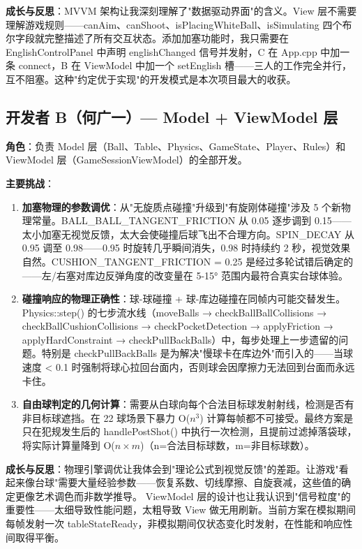 \documentclass[11pt]{ctexart}
\begin{document}
\textbf{成长与反思}：MVVM 架构让我深刻理解了"数据驱动界面"的含义。View 层不需要理解游戏规则——canAim、canShoot、isPlacingWhiteBall、isSimulating 四个布尔字段就完整描述了所有交互状态。添加加塞功能时，我只需要在 EnglishControlPanel 中声明 englishChanged 信号并发射，C 在 App.cpp 中加一条 connect，B 在 ViewModel 中加一个 setEnglish 槽——三人的工作完全并行，互不阻塞。这种"约定优于实现"的开发模式是本次项目最大的收获。

\subsection{开发者 B（何广一）— Model + ViewModel 层}

\textbf{角色}：负责 Model 层（Ball、Table、Physics、GameState、Player、Rules）和 ViewModel 层（GameSessionViewModel）的全部开发。

\textbf{主要挑战}：
\begin{enumerate}[leftmargin=*]
\item \textbf{加塞物理的参数调优}：从"无旋质点碰撞"升级到"有旋刚体碰撞"涉及 5 个新物理常量。BALL\_BALL\_TANGENT\_FRICTION 从 0.05 逐步调到 0.15——太小加塞无视觉反馈，太大会使碰撞后球飞出不合理方向。SPIN\_DECAY 从 0.95 调至 0.98——0.95 时旋转几乎瞬间消失，0.98 时持续约 2 秒，视觉效果自然。CUSHION\_TANGENT\_FRICTION = 0.25 是经过多轮试错后确定的——左/右塞对库边反弹角度的改变量在 5-15° 范围内最符合真实台球体验。
\item \textbf{碰撞响应的物理正确性}：球-球碰撞 + 球-库边碰撞在同帧内可能交替发生。Physics::step() 的七步流水线（moveBalls → checkBallBallCollisions → checkBallCushionCollisions → checkPocketDetection → applyFriction → applyHardConstraint → checkPullBackBalls）中，每步处理上一步遗留的问题。特别是 checkPullBackBalls 是为解决"慢球卡在库边外"而引入的——当球速度 < 0.1 时强制将球心拉回台面内，否则球会因摩擦力无法回到台面而永远卡住。
\item \textbf{自由球判定的几何计算}：需要从白球向每个合法目标球发射射线，检测是否有非目标球遮挡。在 22 球场景下暴力 O($n^3$) 计算每帧都不可接受。最终方案是只在犯规发生后的 handlePostShot() 中执行一次检测，且提前过滤掉落袋球，将实际计算量降到 O($n \times m$)（n=合法目标球数，m=非目标球数）。
\end{enumerate}

\textbf{成长与反思}：物理引擎调优让我体会到"理论公式到视觉反馈"的差距。让游戏"看起来像台球"需要大量经验参数——恢复系数、切线摩擦、自旋衰减，这些值的确定更像艺术调色而非数学推导。
ViewModel 层的设计也让我认识到"信号粒度"的重要性——太细导致性能问题，太粗导致 View 做无用刷新。当前方案在模拟期间每帧发射一次 tableStateReady，非模拟期间仅状态变化时发射，在性能和响应性间取得平衡。
\end{document}
